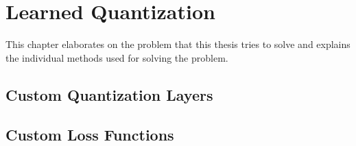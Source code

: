 \chapter{Learned Quantization\label{cha:chapter3}}
This chapter elaborates on the problem that this thesis tries to solve and explains the individual methods used for solving the problem. 


\section{Custom Quantization Layers}
\label{subsec:subsection1}

\section{Custom Loss Functions}
\label{subsec:subsection2}
